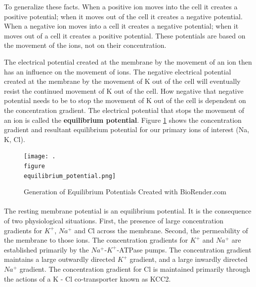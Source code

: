 To generalize these facts. When a positive ion moves into the cell it creates a positive potential; when it moves out of the cell it creates a negative potential. When a negative ion moves into a cell it creates a negative potential; when it moves out of a cell it creates a positive potential. These potentials are based on the movement of the ions, not on their concentration. 

The electrical potential created at the membrane by the movement of an ion then has an influence on the movement of ions. The negative electrical potential created at the membrane by the movement of K out of the cell will eventually resist the continued movement of K out of the cell. How negative that negative potential needs to be to stop the movement of K out of the cell is dependent on the concentration gradient.\footnotemark{} The electrical potential that stops the movement of an ion is called the \textbf{equilibrium potential}. Figure \ref{fig:equilibrium_potential} shows the concentration gradient and resultant equilibrium potential for our primary ions of interest (Na, K, Cl).

\begin{figure}
    \centering
    \texttt{[image: .\\figure\\equilibrium\_potential.png]}
    \caption{Generation of Equilibrium Potentials \footnotesize{Created with BioRender.com}}
    \label{fig:equilibrium_potential}
\end{figure}

\paragraph{}
The resting membrane potential is an equilibrium potential. It is the consequence of two physiological situations. First, the presence of large concentration gradients for $K^+$, $Na^+$  and Cl across the membrane. Second, the permeability of the membrane to those ions. 
The concentration gradients for $K^+$ and $Na^+$ are established primarily by the $Na^+$-$K^+$-ATPase pumps. The concentration gradient maintains a large outwardly directed $K^+$ gradient, and a large inwardly directed $Na^+$ gradient. The concentration gradient for Cl is maintained primarily through the actions of a K - Cl co-transporter known as KCC2.

